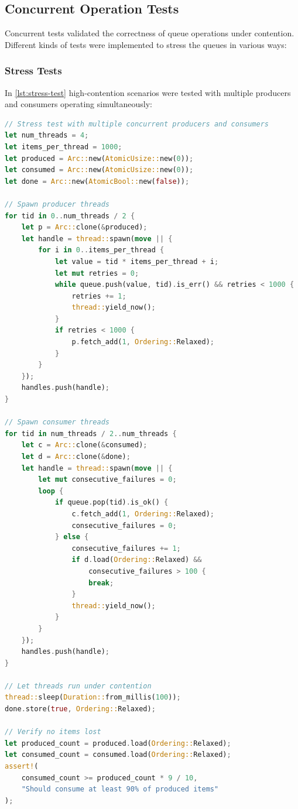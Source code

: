 \subsection{Concurrent Operation Tests}
Concurrent tests validated the correctness of queue operations under contention. Different kinds of tests were implemented to stress the queues in various ways:

\subsubsection{Stress Tests}
In \cref{lst:stress-test} high-contention scenarios were tested with multiple producers and consumers operating simultaneously:

\begin{lstlisting}[language=Rust, style=boxed, caption={High-contention stress test}, label={lst:stress-test}]
// Stress test with multiple concurrent producers and consumers
let num_threads = 4;
let items_per_thread = 1000;
let produced = Arc::new(AtomicUsize::new(0));
let consumed = Arc::new(AtomicUsize::new(0));
let done = Arc::new(AtomicBool::new(false));

// Spawn producer threads
for tid in 0..num_threads / 2 {
    let p = Arc::clone(&produced);
    let handle = thread::spawn(move || {
        for i in 0..items_per_thread {
            let value = tid * items_per_thread + i;
            let mut retries = 0;
            while queue.push(value, tid).is_err() && retries < 1000 {
                retries += 1;
                thread::yield_now();
            }
            if retries < 1000 {
                p.fetch_add(1, Ordering::Relaxed);
            }
        }
    });
    handles.push(handle);
}

// Spawn consumer threads
for tid in num_threads / 2..num_threads {
    let c = Arc::clone(&consumed);
    let d = Arc::clone(&done);
    let handle = thread::spawn(move || {
        let mut consecutive_failures = 0;
        loop {
            if queue.pop(tid).is_ok() {
                c.fetch_add(1, Ordering::Relaxed);
                consecutive_failures = 0;
            } else {
                consecutive_failures += 1;
                if d.load(Ordering::Relaxed) && 
                    consecutive_failures > 100 {
                    break;
                }
                thread::yield_now();
            }
        }
    });
    handles.push(handle);
}

// Let threads run under contention
thread::sleep(Duration::from_millis(100));
done.store(true, Ordering::Relaxed);

// Verify no items lost
let produced_count = produced.load(Ordering::Relaxed);
let consumed_count = consumed.load(Ordering::Relaxed);
assert!(
    consumed_count >= produced_count * 9 / 10,
    "Should consume at least 90% of produced items"
);
\end{lstlisting}


